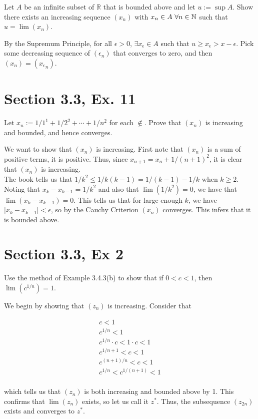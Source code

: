 \documentclass[paper=a4, fontsize=11pt]{scrartcl} %
\numberwithin{equation}{section} %
\numberwithin{figure}{section} %
\numberwithin{table}{section} %
\begin{document}
Let $A$ be an infinite subset of $\mathbb{R}$ that is bounded above and let $u := \sup A$. Show there exists an increasing sequence $(x_n)$ with $x_n \in A ~ \forall n \in \mathbb{N}$ such that $u = \lim(x_n)$.

\pf By the Supremum Principle, for all $\epsilon > 0$, $\exists x_\epsilon \in A$ such that $u \geq x_\epsilon > x - \epsilon$. Pick some decreasing sequence of $(\epsilon_n)$ that converges to zero, and then $(x_n) = ({x_\epsilon}_n)$. \done

\section*{Section 3.3, Ex. 11}

Let $x_n := 1/1^1 + 1/2^2 + \cdots + 1/n^2$ for each $\nin$. Prove that $(x_n)$ is increasing and bounded, and hence converges.

\pf We want to show that $(x_n)$ is increasing. First note that $(x_n)$ is a sum of positive terms, it is positive. Thus, since $x_{n+1} = x_n + 1/(n+1)^2$, it is clear that $(x_n)$ is increasing.\\

The book tells us that $1/k^2 \leq 1/k(k-1) = 1/(k-1) - 1/k$ when $k \geq 2$. Noting that $x_k - x_{k-1} = 1/k^2$ and also that $\lim(1/k^2) = 0$, we have that $\lim(x_k - x_{k-1}) = 0$. This tells us that for large enough $k$, we have $|x_k - x_{k-1}| < \epsilon$, so by the Cauchy Criterion $(x_n)$ converges. This infers that it is bounded above. \done

\section*{Section 3.3, Ex 2}

Use the method of Example 3.4.3(b) to show that if $0 < c < 1$, then $\lim(c^{1/n}) = 1$.

\pf We begin by showing that $(z_n)$ is increasing. Consider that

\begin{gather*}
c < 1\\
c^{1/n} < 1\\
c^{1/n} \cdot c < 1 \cdot c < 1\\
c^{1/n + 1} < c < 1\\
c^{(n + 1)/n} < c < 1\\
c^{1/n} < c^{1/(n+1)} < 1\\
\end{gather*}

which tells us that $(z_n)$ is both increasing and bounded above by 1. This confirms that $\lim(z_n)$ exists, so let us call it $z^*$. Thus, the subsequence $(z_{2n})$ exists and converges to $z^*$.\\
\end{document}
